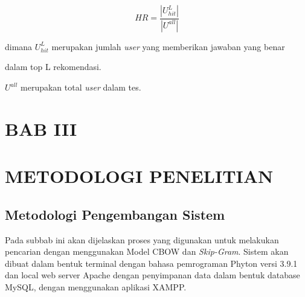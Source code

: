 \documentclass[12pt]{report}
\begin{document}
\begin{equation}
HR = \frac{|U^L_{hit}|}{|U^{all}|}
\end{equation}

dimana $U^L_{hit}$ merupakan jumlah \textit{user} yang memberikan jawaban yang benar 

dalam top L rekomendasi.

$U^{all}$ merupakan total \textit{user} dalam tes.

\newpage
\section[METODOLOGI PENELITIAN]{BAB III}
\section*{METODOLOGI PENELITIAN}
\thispagestyle{plain}
\subsection{Metodologi Pengembangan Sistem}

Pada subbab ini akan dijelaskan proses yang digunakan untuk melakukan pencarian dengan menggunakan Model CBOW dan \textit{Skip-Gram}. Sistem akan dibuat dalam bentuk terminal dengan bahasa pemrograman Phyton versi 3.9.1 dan local web server Apache dengan penyimpanan data dalam bentuk database MySQL, dengan menggunakan aplikasi XAMPP.
\end{document}
